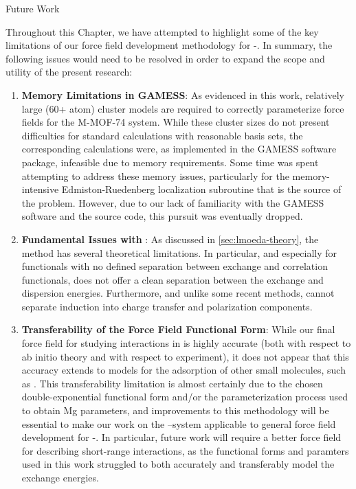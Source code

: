 \begin{section}{Future Work}
\label{sec:lmoeda-future_work}

Throughout this Chapter, we have attempted to highlight some of the key
limitations of our force field development methodology for \cus-\mofs. 
In summary, the following issues would need to be resolved in order to expand the
scope and utility of the present research:
\begin{enumerate}
%
\item \textbf{Memory Limitations in GAMESS}: 
%
As evidenced in this work,
relatively large (60+ atom) cluster models are required to correctly
parameterize force fields for the M-MOF-74 system. While these cluster sizes
do not present difficulties for standard \dft calculations with reasonable
basis sets, the corresponding
\lmoeda calculations were, as implemented in the GAMESS software package,
infeasible due to memory requirements. Some time was spent attempting to
address these memory issues, particularly for the memory-intensive
Edmiston-Ruedenberg localization subroutine that is the source of the problem.
However, due to our lack of familiarity with the GAMESS software and the
\lmoeda source code, this pursuit was eventually dropped. 
%
\item \textbf{Fundamental Issues with \lmoeda}: 
%
As discussed in \cref{sec:lmoeda-theory}, the \lmoeda method has several
theoretical limitations. In particular, and especially for functionals with no
defined separation between exchange and correlation functionals, \lmoeda does
not offer a clean separation between the exchange and dispersion energies.
Furthermore, and unlike some recent \eda
methods,\cite{Misquitta2013,Horn2016b} \lmoeda cannot separate induction
into charge transfer and polarization components. 
%
\item \textbf{Transferability of the Force Field Functional Form}: 
%
While our
final force field for 
studying \co interactions in \mgmof is highly accurate (both with respect to
ab initio theory and with respect to experiment), it does not appear that this 
accuracy extends to models for the adsorption of other small molecules, such as
. This transferability limitation is almost certainly due to the chosen
double-exponential functional form and/or the parameterization process used to
obtain Mg parameters, and improvements to this methodology will be essential
to make our work on the \co--\mgmof system applicable to general force field
development for \cus-\mofs. In particular, future work will require a better force field for describing
short-range interactions, as the functional forms and paramters used in this
work struggled to both accurately and transferably model the \mgmof exchange energies.
%
\end{enumerate}


\end{section}

